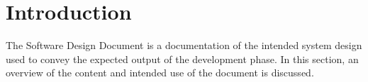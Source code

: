 \section{Introduction}

The Software Design Document is a documentation of the intended system design used to convey the expected output of the development phase. In this section, an overview of the content and intended use of the document is discussed.












